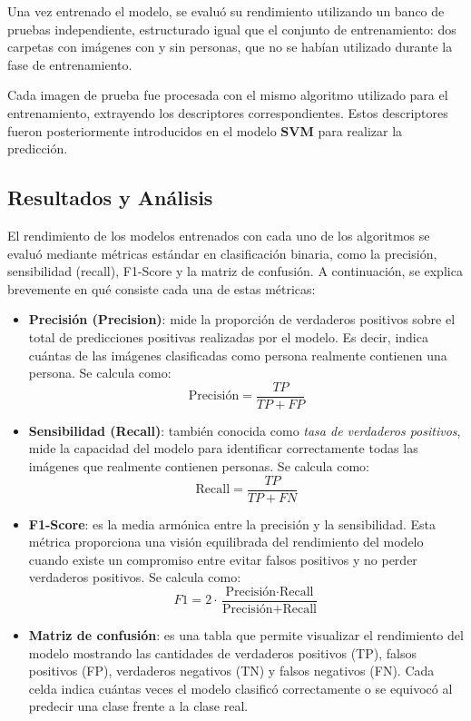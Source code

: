 \documentclass[a4paper]{article}
\begin{document}
Una vez entrenado el modelo, se evaluó su rendimiento utilizando un banco de pruebas independiente, estructurado igual que el conjunto de entrenamiento: dos carpetas con imágenes con y sin personas, que no se habían utilizado durante la fase de entrenamiento.
\par\vspace{0.5cm}

Cada imagen de prueba fue procesada con el mismo algoritmo utilizado para el entrenamiento, extrayendo los descriptores correspondientes. Estos descriptores fueron posteriormente introducidos en el modelo \textbf{SVM} para realizar la predicción.

\subsection{Resultados y Análisis}

El rendimiento de los modelos entrenados con cada uno de los algoritmos se evaluó mediante métricas estándar en clasificación binaria, como la precisión, sensibilidad (recall), F1-Score y la matriz de confusión. A continuación, se explica brevemente en qué consiste cada una de estas métricas:

\begin{itemize}
    \item \textbf{Precisión (Precision)}: mide la proporción de verdaderos positivos sobre el total de predicciones positivas realizadas por el modelo. Es decir, indica cuántas de las imágenes clasificadas como persona realmente contienen una persona. Se calcula como: 
    \[
    \text{Precisión} = \frac{TP}{TP + FP}
    \]

    \item \textbf{Sensibilidad (Recall)}: también conocida como \textit{tasa de verdaderos positivos}, mide la capacidad del modelo para identificar correctamente todas las imágenes que realmente contienen personas. Se calcula como:
    \[
    \text{Recall} = \frac{TP}{TP + FN}
    \]

    \item \textbf{F1-Score}: es la media armónica entre la precisión y la sensibilidad. Esta métrica proporciona una visión equilibrada del rendimiento del modelo cuando existe un compromiso entre evitar falsos positivos y no perder verdaderos positivos. Se calcula como:
    \[
    F1 = 2 \cdot \frac{\text{Precisión} \cdot \text{Recall}}{\text{Precisión} + \text{Recall}}
    \]

    \item \textbf{Matriz de confusión}: es una tabla que permite visualizar el rendimiento del modelo mostrando las cantidades de verdaderos positivos (TP), falsos positivos (FP), verdaderos negativos (TN) y falsos negativos (FN). Cada celda indica cuántas veces el modelo clasificó correctamente o se equivocó al predecir una clase frente a la clase real.
\end{itemize}
\end{document}
